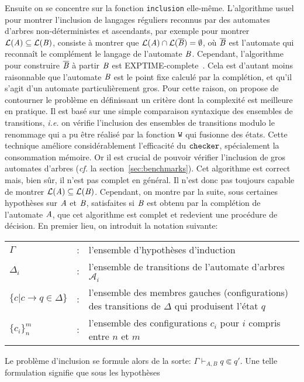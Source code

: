 Ensuite on se concentre sur la fonction \lstinline!inclusion! elle-même. 
L'algorithme usuel pour montrer l'inclusion de langages réguliers reconnus
par des automates d'arbres non-déterministes et ascendants, par exemple
pour montrer $\mathcal{L}(\mathit A) \subseteq \mathcal{L}(\mathit B)$, consiste à montrer que $\mathcal{L}(\mathit A) \cap
\mathcal{L}(\overline{\mathit B}) =\emptyset$, où $\overline{\mathit B}$ est l'automate qui reconnaît le complément 
le langage de l'automate $\mathit B$. Cependant, l'algorithme pour construire $\overline{\mathit B}$ à partir
$\mathit B$ est EXPTIME-complete~\cite{TATA}. Cela est d'autant moins raisonnable que l'automate $\mathit B$ est
le point fixe calculé par la complétion, et qu'il s'agit d'un automate particulièrement gros.
Pour cette raison, on propose de contourner le problème en définissant un critère dont
la complexité est meilleure en pratique. Il est basé sur une simple comparaison syntaxique
des ensembles de transitions, \textit{i.e.} on vérifie l'inclusion des ensembles de transitions
modulo le renommage qui a pu être réalisé par la fonction $\mathtt{W}$ qui fusionne des états.
Cette technique améliore considérablement l'efficacité du $\mathtt{checker}$, spécialement la consommation
mémoire. Or il est crucial de pouvoir vérifier l'inclusion de gros automates d'arbres (\textit{cf.}
la section~\ref{sec:benchmarks}). Cet algorithme est correct mais, bien sûr, il n'est pas 
complet en général. Il n'est donc pas toujours capable de montrer $\mathcal{L}(\mathit A) \subseteq \mathcal{L}(\mathit B)$.
Cependant, on montre par la suite, sous certaines hypothèses sur $\mathit A$ et $\mathit B$, satisfaites
si $\mathit B$ est obtenu par la complétion de l'automate $\mathit A$, que cet algorithme est complet et redevient une procédure de
décision. En premier lieu, on introduit la notation suivante:
{\small
\begin{center}
  \begin{tabular}[c]{lcp{10cm}}
    $\Gamma$    & : & l'ensemble d'hypothèses d'induction\\
    $\Delta_i$  & : & l'ensemble de transitions de l'automate d'arbres $\mathcal{A}_i$\\
    $\{c|c \rightarrow q \in \Delta\}$ & : & l'ensemble des membres gauches (configurations) des transitions de $\Delta$ qui produisent l'état $q$\\
    $\{c_i\}_n^m$ & : & l'ensemble des configurations $c_i$ pour $i$ compris entre $n$ et $m$\\
  \end{tabular}
\end{center}
} Le problème d'inclusion se formule alors de la sorte: ${\Gamma
  \vdash_{A, B} q \Subset q'}$. Une telle formulation signifie que sous les hypothèses
